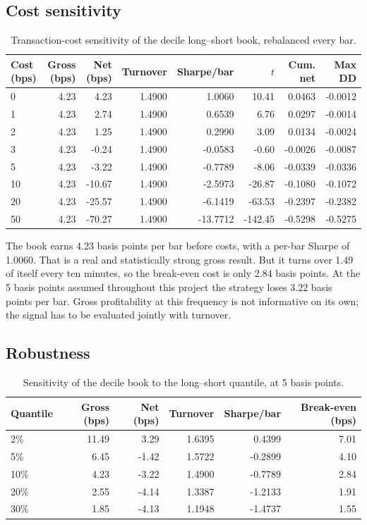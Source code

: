 \documentclass[11pt]{article}
\begin{document}
\subsection{Cost sensitivity}

\begin{table}[!htbp]
\centering
\small
\caption{Transaction-cost sensitivity of the decile long--short book,
rebalanced every bar.}
\label{tab:costs}
\begin{tabular}{lrrrrrrr}
\toprule
Cost (bps) & Gross (bps) & Net (bps) & Turnover & Sharpe/bar & $t$ & Cum. net & Max DD \\
\midrule
0 & 4.23 & 4.23 & 1.4900 & 1.0060 & 10.41 & 0.0463 & -0.0012 \\
1 & 4.23 & 2.74 & 1.4900 & 0.6539 & 6.76 & 0.0297 & -0.0014 \\
2 & 4.23 & 1.25 & 1.4900 & 0.2990 & 3.09 & 0.0134 & -0.0024 \\
3 & 4.23 & -0.24 & 1.4900 & -0.0583 & -0.60 & -0.0026 & -0.0087 \\
5 & 4.23 & -3.22 & 1.4900 & -0.7789 & -8.06 & -0.0339 & -0.0336 \\
10 & 4.23 & -10.67 & 1.4900 & -2.5973 & -26.87 & -0.1080 & -0.1072 \\
20 & 4.23 & -25.57 & 1.4900 & -6.1419 & -63.53 & -0.2397 & -0.2382 \\
50 & 4.23 & -70.27 & 1.4900 & -13.7712 & -142.45 & -0.5298 & -0.5275 \\
\bottomrule
\end{tabular}
\end{table}

The book earns 4.23 basis points per bar before costs, with a per-bar
Sharpe of 1.0060. That is a real and statistically strong gross result.
But it turns over 1.49 of itself every ten minutes, so the break-even cost
is only 2.84 basis points. At the 5 basis points assumed throughout this
project the strategy loses 3.22 basis points per bar. Gross profitability at
this frequency is not informative on its own; the signal has to be evaluated
jointly with turnover.

\subsection{Robustness}

\begin{table}[!htbp]
\centering
\small
\caption{Sensitivity of the decile book to the long--short quantile, at 5 basis
points.}
\label{tab:robustness}
\begin{tabular}{lrrrrr}
\toprule
Quantile & Gross (bps) & Net (bps) & Turnover & Sharpe/bar & Break-even (bps) \\
\midrule
2\% & 11.49 & 3.29 & 1.6395 & 0.4399 & 7.01 \\
5\% & 6.45 & -1.42 & 1.5722 & -0.2899 & 4.10 \\
10\% & 4.23 & -3.22 & 1.4900 & -0.7789 & 2.84 \\
20\% & 2.55 & -4.14 & 1.3387 & -1.2133 & 1.91 \\
30\% & 1.85 & -4.13 & 1.1948 & -1.4737 & 1.55 \\
\bottomrule
\end{tabular}
\end{table}
\end{document}
